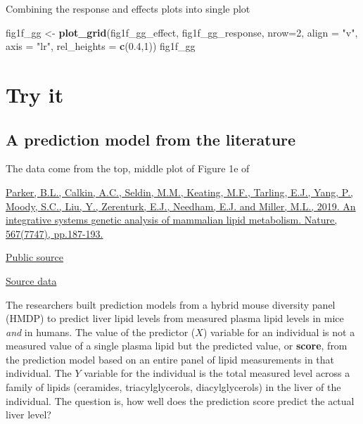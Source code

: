 \documentclass[]{book}
\newenvironment{Shaded}{\begin{snugshade}}{\end{snugshade}}
\newcommand{\DataTypeTok}[1]{\textcolor[rgb]{0.13,0.29,0.53}{#1}}
\newcommand{\DecValTok}[1]{\textcolor[rgb]{0.00,0.00,0.81}{#1}}
\newcommand{\FloatTok}[1]{\textcolor[rgb]{0.00,0.00,0.81}{#1}}
\newcommand{\KeywordTok}[1]{\textcolor[rgb]{0.13,0.29,0.53}{\textbf{#1}}}
\newcommand{\NormalTok}[1]{#1}
\newcommand{\StringTok}[1]{\textcolor[rgb]{0.31,0.60,0.02}{#1}}
\begin{document}
Combining the response and effects plots into single plot

\begin{Shaded}
\begin{Highlighting}[]
\NormalTok{fig1f_gg <-}\StringTok{ }\KeywordTok{plot_grid}\NormalTok{(fig1f_gg_effect,}
\NormalTok{                      fig1f_gg_response,}
                      \DataTypeTok{nrow=}\DecValTok{2}\NormalTok{,}
                      \DataTypeTok{align =} \StringTok{"v"}\NormalTok{,}
                      \DataTypeTok{axis =} \StringTok{"lr"}\NormalTok{,}
                      \DataTypeTok{rel_heights =} \KeywordTok{c}\NormalTok{(}\FloatTok{0.4}\NormalTok{,}\DecValTok{1}\NormalTok{))}
\NormalTok{fig1f_gg}
\end{Highlighting}
\end{Shaded}

\hypertarget{try-it}{%
\section{Try it}\label{try-it}}

\hypertarget{a-prediction-model-from-the-literature}{%
\subsection{A prediction model from the literature}\label{a-prediction-model-from-the-literature}}

The data come from the top, middle plot of Figure 1e of

\href{https://idp.nature.com/authorize/casa?redirect_uri=https://www.nature.com/articles/s41586-019-0984-y\&casa_token=9rpBLACc40cAAAAA:BzRKQHYdU9DOrzBS0f0lwrbp07MlfVqqL4yuyedE5b_xZ8geHuUCPFIDE3yQUBO-ibQLCrCI4t84aO8}{Parker, B.L., Calkin, A.C., Seldin, M.M., Keating, M.F., Tarling, E.J., Yang, P., Moody, S.C., Liu, Y., Zerenturk, E.J., Needham, E.J. and Miller, M.L., 2019. An integrative systems genetic analysis of mammalian lipid metabolism. Nature, 567(7747), pp.187-193.}

\href{https://www.ncbi.nlm.nih.gov/pmc/articles/PMC6656374/}{Public source}

\href{https://www.nature.com/articles/s41586-019-0984-y\#Sec35}{Source data}

The researchers built prediction models from a hybrid mouse diversity panel (HMDP) to predict liver lipid levels from measured plasma lipid levels in mice \emph{and} in humans. The value of the predictor (\(X\)) variable for an individual is not a measured value of a single plasma lipid but the predicted value, or \textbf{score}, from the prediction model based on an entire panel of lipid measurements in that individual. The \(Y\) variable for the individual is the total measured level across a family of lipids (ceramides, triacylglycerols, diacylglycerols) in the liver of the individual. The question is, how well does the prediction score predict the actual liver level?
\end{document}

